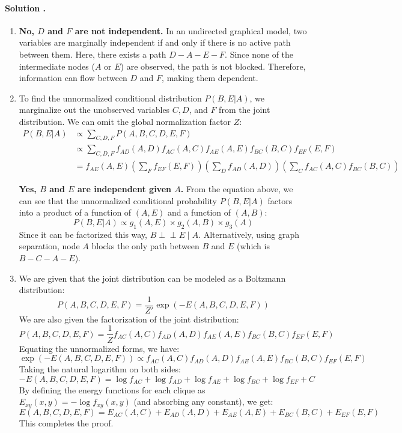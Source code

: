 \documentclass{article}
\newcounter{solutionCount}
\newcommand{\solution}[1]{
    \stepcounter{solutionCount}
    \paragraph{Solution \thesolutionCount.}
    {
        #1
    }
}
\begin{document}
\solution{
    \begin{enumerate}
        \item \textbf{No, $D$ and $F$ are not independent.} 
        In an undirected graphical model, two variables are marginally independent if and only if there is no active path between them. Here, there exists a path $D - A - E - F$. Since none of the intermediate nodes ($A$ or $E$) are observed, the path is not blocked. Therefore, information can flow between $D$ and $F$, making them dependent.

        \item To find the unnormalized conditional distribution $P(B,E|A)$, we marginalize out the unobserved variables $C, D$, and $F$ from the joint distribution. We can omit the global normalization factor $Z$:
        \begin{align*}
            P(B,E|A) &\propto \sum_{C,D,F} P(A,B,C,D,E,F) \\
            &\propto \sum_{C,D,F} f_{AD}(A,D) f_{AC}(A,C) f_{AE}(A,E) f_{BC}(B,C) f_{EF}(E,F) \\
            &= f_{AE}(A,E) \left(\sum_F f_{EF}(E,F)\right) \left(\sum_D f_{AD}(A,D)\right) \left(\sum_C f_{AC}(A,C) f_{BC}(B,C)\right)
        \end{align*}
        
        \textbf{Yes, $B$ and $E$ are independent given $A$.} 
        From the equation above, we can see that the unnormalized conditional probability $P(B,E|A)$ factors into a product of a function of $(A,E)$ and a function of $(A,B)$: 
        \[ P(B,E|A) \propto g_1(A,E) \times g_2(A,B) \times g_3(A) \]
        Since it can be factorized this way, $B \perp\!\!\!\perp E \mid A$. Alternatively, using graph separation, node $A$ blocks the only path between $B$ and $E$ (which is $B-C-A-E$).

        \item We are given that the joint distribution can be modeled as a Boltzmann distribution:
        \[ P(A,B,C,D,E,F) = \frac{1}{Z'} \exp(-E(A,B,C,D,E,F)) \]
        We are also given the factorization of the joint distribution:
        \[ P(A,B,C,D,E,F) = \frac{1}{Z} f_{AC}(A,C) f_{AD}(A,D) f_{AE}(A,E) f_{BC}(B,C) f_{EF}(E,F) \]
        Equating the unnormalized forms, we have:
        \[ \exp(-E(A,B,C,D,E,F)) \propto f_{AC}(A,C) f_{AD}(A,D) f_{AE}(A,E) f_{BC}(B,C) f_{EF}(E,F) \]
        Taking the natural logarithm on both sides:
        \[ -E(A,B,C,D,E,F) = \log f_{AC} + \log f_{AD} + \log f_{AE} + \log f_{BC} + \log f_{EF} + C \]
        By defining the energy functions for each clique as $E_{xy}(x,y) = -\log f_{xy}(x,y)$ (and absorbing any constant), we get:
        \[ E(A,B,C,D,E,F) = E_{AC}(A,C) + E_{AD}(A,D) + E_{AE}(A,E) + E_{BC}(B,C) + E_{EF}(E,F) \]
        This completes the proof.
    \end{enumerate}
}
\end{document}
